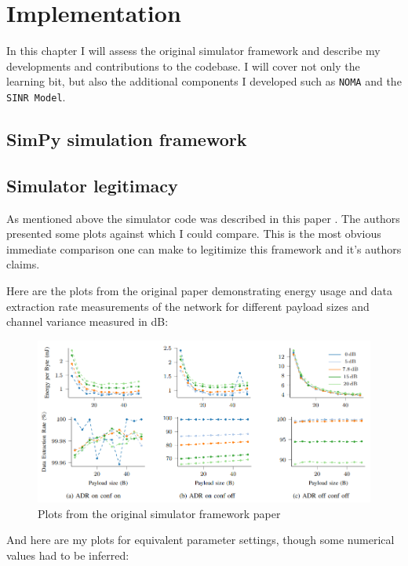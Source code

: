 \chapter{Implementation}

In this chapter I will assess the original simulator framework \cite{simulator_github} and describe my developments and contributions to the codebase. 
I will cover not only the learning bit, but also the 
additional components I developed such as \texttt{NOMA} and the \texttt{SINR Model}. 

\section{SimPy simulation framework}

\section{Simulator legitimacy}
As mentioned above the simulator code was described in this 
paper \cite{simulator}. The authors presented some plots against
which I could compare. This is the most obvious immediate 
comparison one can make to legitimize this framework and it's
authors claims. 

Here are the plots from the original paper demonstrating 
energy usage and data extraction rate measurements of the
network for different payload sizes and channel variance 
measured in dB:

\begin{figure}[h]
\centering
\includegraphics[scale=0.6]{figures/original_plots.PNG}
  \caption{Plots from the original simulator framework paper \cite{simulator}}
  \label{fig:my_sectors}
\end{figure}

And here are my plots for equivalent parameter settings, though
some numerical values had to be inferred:

